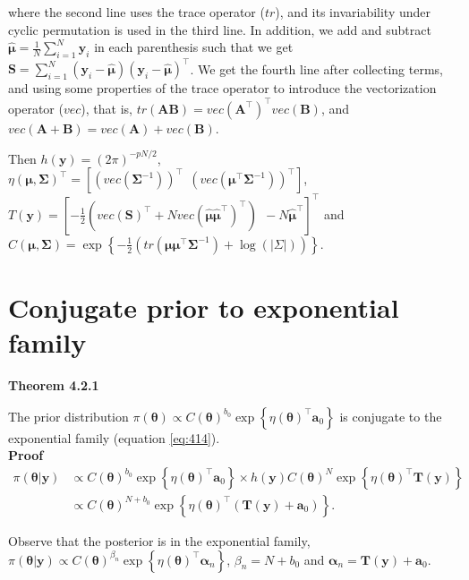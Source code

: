 \begin{enumerate}
where the second line uses the trace operator ($tr$), and its invariability under cyclic permutation is used in the third line. In addition, we add and subtract $\hat{\bm{\mu}}=\frac{1}{N}\sum_{i=1}^N\bm{y}_i$ in each parenthesis such that we get $\bm{S}=\sum_{i=1}^N\left(\bm{y}_i-\hat{\bm{\mu}}\right)\left(\bm{y}_i-\hat{\bm{\mu}}\right)^{\top}$. We get the fourth line after collecting terms, and using some properties of the trace operator to introduce the vectorization operator ($vec$), that is, $tr({\bm{AB}})=vec({\bm{A}}^{\top})^{\top}vec({\bm{B}})$, and $vec({\bm{A}}+{\bm{B}})=vec({\bm{A}})+vec({\bm{B}})$.

Then $h(\bm{y})=(2\pi)^{-pN/2}$, $\eta(\bm{\mu},\bm{\Sigma})^{\top}=\left[\left(vec\left(\bm{\Sigma}^{-1}\right)\right)^{\top} \ \ \left(vec\left(\bm{\mu}^{\top}\bm{\Sigma}^{-1}\right)\right)^{\top}\right]$, $T(\bm{y})=\left[-\frac{1}{2}\left(vec\left(\bm{S}\right)^{\top}+N vec\left(\hat{\bm{\mu}}\hat{\bm{\mu}}^{\top}\right)^{\top}\right) \ \ -N\hat{\bm{\mu}}^{\top}\right]^{\top}$ and $C(\bm{\mu},\bm{\Sigma})=\exp\left\{-\frac{1}{2}\left(tr\left(\bm{\mu}\bm{\mu}^{\top}\bm{\Sigma}^{-1}\right)+\log(|\Sigma|)\right)\right\}$.
\end{enumerate}

\section{Conjugate prior to exponential family}\label{sec42}

\textbf{Theorem 4.2.1}

The prior distribution $\pi(\bm{\theta})\propto C(\bm{\theta})^{b_0}\exp\left\{\eta(\bm{\theta})^{\top}\bm{a}_0\right\}$ is conjugate to the exponential family (equation \ref{eq:414}).\\

\textbf{Proof}
\begin{align}
	\pi(\bm{\theta}|\bm{y})& \propto C(\bm{\theta})^{b_0}\exp\left\{\eta(\bm{\theta})^{\top}\bm{a}_0\right\} \times h(\bm{y}) C(\bm{\theta})^N\exp\left\{\eta(\bm{\theta})^{\top}\bm{T}(\bm{y})\right\}\nonumber\\
	& \propto C(\bm{\theta})^{N+b_0} \exp\left\{\eta(\bm{\theta})^{\top}(\bm{T}(\bm{y})+\bm{a}_0)\right\}.\nonumber 
\end{align}

Observe that the posterior is in the exponential family, $\pi(\bm{\theta}|\bm{y})\propto C(\bm{\theta})^{\beta_n} \exp\left\{\eta(\bm{\theta})^{\top}\bm{\alpha}_n\right\}$, $\beta_n=N+b_0$ and $\bm{\alpha}_n=\bm{T}(\bm{y})+\bm{a}_0$.\\

